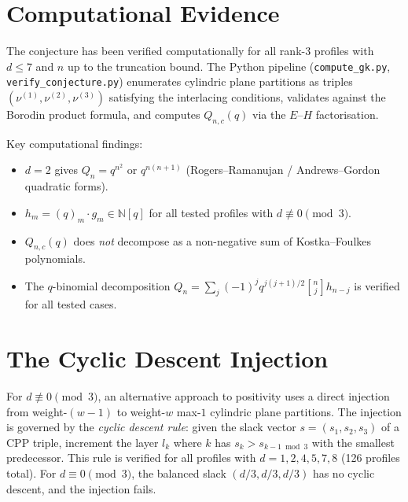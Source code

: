 \documentclass[11pt]{report}
\newcommand{\N}{\mathbb{N}}
\newcommand{\qbin}[2]{\genfrac{[}{]}{0pt}{}{#1}{#2}}
\theoremstyle{plain}
\theoremstyle{definition}
\begin{document}
\chapter{Computational Evidence}
\label{app:computation}

The conjecture has been verified computationally for all
rank-$3$ profiles with $d \leq 7$ and $n$ up to the
truncation bound.  The Python pipeline
(\texttt{compute\_gk.py}, \texttt{verify\_conjecture.py})
enumerates cylindric plane partitions as triples
$(\nu^{(1)}, \nu^{(2)}, \nu^{(3)})$ satisfying the
interlacing conditions, validates against the Borodin
product formula, and computes $Q_{n,c}(q)$ via the
$E$--$H$ factorisation.

Key computational findings:
\begin{itemize}
  \item $d = 2$ gives $Q_n = q^{n^2}$ or $q^{n(n+1)}$
    (Rogers--Ramanujan / Andrews--Gordon quadratic forms).
  \item $h_m = (q)_m \cdot g_m \in \N[q]$ for all tested
    profiles with $d \not\equiv 0 \pmod{3}$.
  \item $Q_{n,c}(q)$ does \emph{not} decompose as a
    non-negative sum of Kostka--Foulkes polynomials.
  \item The $q$-binomial decomposition
    $Q_n = \sum_j (-1)^j q^{j(j+1)/2} \qbin{n}{j} h_{n-j}$
    is verified for all tested cases.
\end{itemize}



\chapter{The Cyclic Descent Injection}
\label{app:cyclic-descent}

For $d \not\equiv 0 \pmod{3}$, an alternative approach to
positivity uses a direct injection from weight-$(w{-}1)$
to weight-$w$ max-$1$ cylindric plane partitions.  The
injection is governed by the \emph{cyclic descent rule}:
given the slack vector $s = (s_1, s_2, s_3)$ of a CPP
triple, increment the layer $l_k$ where $k$ has
$s_k > s_{k-1 \bmod 3}$ with the smallest predecessor.
This rule is verified for all profiles with
$d = 1, 2, 4, 5, 7, 8$ (126 profiles total).  For
$d \equiv 0 \pmod{3}$, the balanced slack $(d/3, d/3, d/3)$
has no cyclic descent, and the injection fails.
\end{document}

